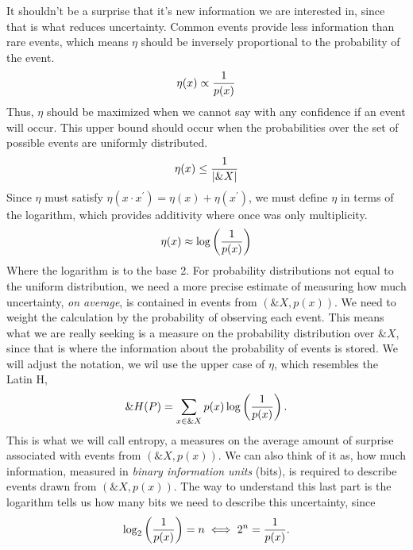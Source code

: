 It shouldn't be a surprise that it's new information we are interested in, since
that is what reduces uncertainty. Common events provide less information than
rare events, which means $\eta$ should be inversely proportional to the
probability of the event.
\begin{align}
  \label{eq:eta-1}
  \eta(x) \propto {1 \over p(x)}
\end{align}
Thus, $\eta$ should be maximized when we cannot say with any confidence if an
event will occur. This upper bound should occur when the probabilities over the
set of possible events are uniformly distributed.
\begin{align}
  \label{eq:eta-2}
  \eta(x) \leq {1 \over |\&X|}
\end{align}
Since $\eta$ must satisfy $\eta(x \cdot x^\prime) = \eta(x) + \eta(x^\prime)$,
we must define $\eta$ in terms of the logarithm, which provides additivity where
once was only multiplicity.
\begin{align}
  \label{eq:eta-3}
  \eta(x) \approx \log{\left({1 \over p(x)}\right)}
\end{align}
Where the logarithm is to the base 2. For probability distributions not equal to
the uniform distribution, we need a more precise estimate of measuring how much
uncertainty, \textit{on average}, is contained in events from $(\&X, p(x))$. We
need to weight the calculation by the probability of observing each event. This
means what we are really seeking is a measure on the probability distribution
over $\&X$, since that is where the information about the probability of events
is stored. We will adjust the notation, we wil use the upper case of $\eta$,
which resembles the Latin H,
\begin{align}
  \label{eq:eta-almost}
  \&H(P) = \sum_{x \in \&X} p(x) \log\left({1 \over p(x)}\right).
\end{align}
This is what we will call entropy, a measures on the average amount of surprise
associated with events from $(\&X, p(x))$. We can also think of it as, how much
information, measured in \textit{binary information units} (bits), is required
to describe events drawn from $(\&X, p(x))$. The way to understand this last
part is the logarithm tells us how many bits we need to describe this
uncertainty, since
\begin{align}
  \label{eq:understand-log}
  \log_2\left( {1 \over p(x)} \right) = n \iff 2^n = {1 \over p(x)}.
\end{align}
